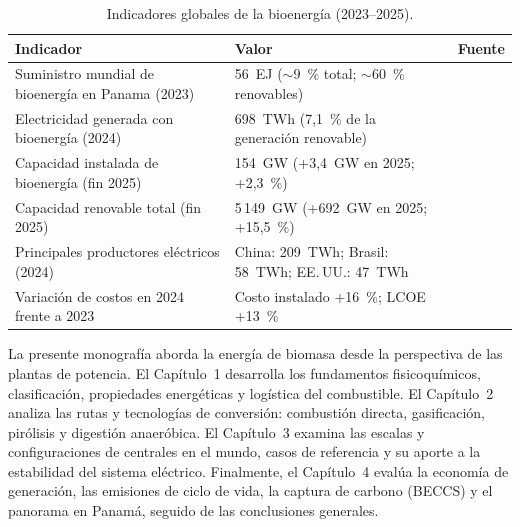 \begin{table}[h!]
\centering
\footnotesize
\caption{Indicadores globales de la bioenergía (2023--2025).}
\label{tab:biomasa_cifras}
\begin{tabularx}{\textwidth}{@{}X l l@{}}
\toprule
\textbf{Indicador} & \textbf{Valor} & \textbf{Fuente} \\
\midrule
Suministro mundial de bioenergía en Panama (2023) & 56~EJ ($\sim$9~\% total; $\sim$60~\% renovables) & \cite{wba2025gbsr} \\
Electricidad generada con bioenergía (2024) & 698~TWh (7,1~\% de la generación renovable) & \cite{wba2025gbsr} \\
Capacidad instalada de bioenergía (fin 2025) & 154~GW (+3,4~GW en 2025; +2,3~\%) & \cite{irena2026capacity} \\
Capacidad renovable total (fin 2025) & 5\,149~GW (+692~GW en 2025; +15,5~\%) & \cite{irena2026capacity} \\
Principales productores eléctricos (2024) & China: 209~TWh; Brasil: 58~TWh; EE.\,UU.: 47~TWh & \cite{wba2025gbsr} \\
Variación de costos en 2024 frente a 2023 & Costo instalado +16~\%; LCOE +13~\% & \cite{irena2025costs} \\
\bottomrule
\end{tabularx}
\end{table}

La presente monografía aborda la energía de biomasa desde la perspectiva de las plantas de potencia. El Capítulo~1 desarrolla los fundamentos fisicoquímicos, clasificación, propiedades energéticas y logística del combustible. El Capítulo~2 analiza las rutas y tecnologías de conversión: combustión directa, gasificación, pirólisis y digestión anaeróbica. El Capítulo~3 examina las escalas y configuraciones de centrales en el mundo, casos de referencia y su aporte a la estabilidad del sistema eléctrico. Finalmente, el Capítulo~4 evalúa la economía de generación, las emisiones de ciclo de vida, la captura de carbono (BECCS) y el panorama en Panamá, seguido de las conclusiones generales.

\clearpage
